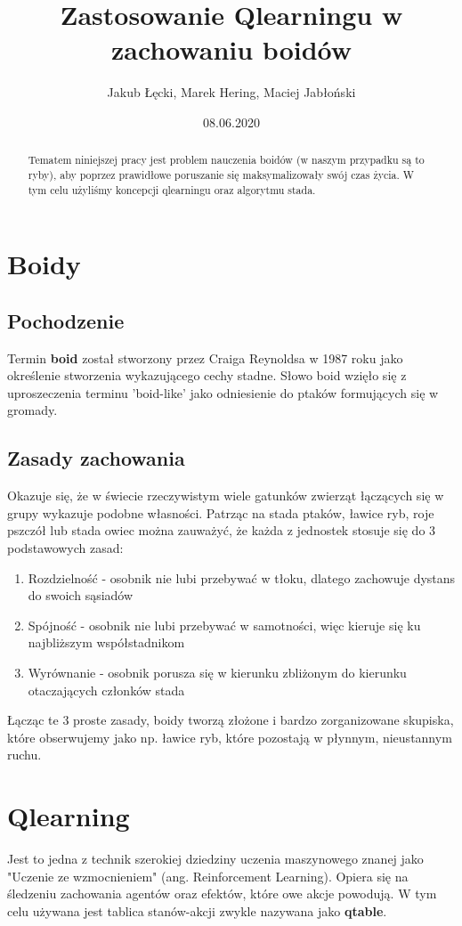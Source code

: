 \documentclass{article}
\title{Zastosowanie Qlearningu w zachowaniu boidów}
\author{Jakub Łęcki, Marek Hering, Maciej Jabłoński}
\date{08.06.2020}
\begin{document}
\maketitle
\begin{abstract}
    Tematem niniejszej pracy jest problem nauczenia boidów (w naszym przypadku są to ryby), aby poprzez prawidłowe poruszanie się maksymalizowały swój czas życia. W tym celu użyliśmy koncepcji qlearningu oraz algorytmu stada.
\end{abstract}

\section{Boidy}
\subsection{Pochodzenie}
Termin \textbf{boid} został stworzony przez Craiga Reynoldsa w 1987 roku jako określenie stworzenia wykazującego cechy stadne. Słowo boid wzięło się z uproszeczenia terminu 'boid-like' jako odniesienie do ptaków formujących się w gromady.
\subsection{Zasady zachowania}
Okazuje się, że w świecie rzeczywistym wiele gatunków zwierząt łączących się w grupy wykazuje podobne własności. Patrząc na stada ptaków, ławice ryb, roje pszczół lub stada owiec można zauważyć, że każda z jednostek stosuje się do 3 podstawowych zasad:
\begin{enumerate}
    \item Rozdzielność - osobnik nie lubi przebywać w tłoku, dlatego zachowuje dystans do swoich sąsiadów
    \item Spójność - osobnik nie lubi przebywać w samotności, więc kieruje się ku najbliższym współstadnikom 
    \item Wyrównanie - osobnik porusza się w kierunku zbliżonym do kierunku otaczających członków stada
\end{enumerate}

Łącząc te 3 proste zasady, boidy tworzą złożone i bardzo zorganizowane skupiska, które obserwujemy jako np. ławice ryb, które pozostają w płynnym, nieustannym ruchu.
\section{Qlearning}
Jest to jedna z technik szerokiej dziedziny uczenia maszynowego znanej jako "Uczenie ze wzmocnieniem" (ang. Reinforcement Learning). Opiera się na śledzeniu zachowania agentów oraz efektów, które owe akcje powodują. W tym celu używana jest tablica stanów-akcji zwykle nazywana jako \textbf{qtable}.
\end{document}

